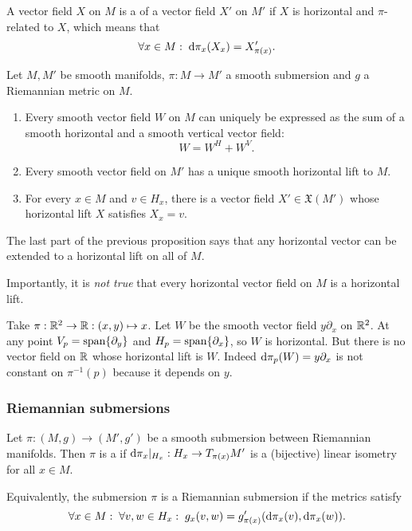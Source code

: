 A vector field $X$ on $M$ is a  of a vector field $X'$ on $M'$ if $X$ is horizontal and $\pi$-related to $X$, which means that
\[ \forall x\in M: \; \operatorname{d \!}{\pi}_x(X_x) = X'_{\pi(x)} .\]

\begin{proposition}
Let $M,M'$ be smooth manifolds, $\pi:M\to M'$ a smooth submersion and $g$ a Riemannian metric on $M$.
\begin{enumerate}
\item Every smooth vector field $W$ on $M$ can uniquely be expressed as the sum of a smooth horizontal and a smooth vertical vector field:
\[ W = W^H + W^V. \]
\item Every smooth vector field on $M'$ has a unique smooth horizontal lift to $M$.
\item For every $x\in M$ and $v\in H_x$, there is a vector field $X'\in\mathfrak{X}(M')$ whose horizontal lift $X$ satisfies $X_x = v$.
\end{enumerate}
\end{proposition}
The last part of the previous proposition says that any horizontal vector can be extended to a horizontal lift on all of $M$.

Importantly, it is \emph{not true} that every horizontal vector field on $M$ is a horizontal lift.
\begin{example}
Take $\pi: \mathbb{R}^2\to\mathbb{R}: (x,y)\mapsto x$. Let $W$ be the smooth vector field $y\partial_x$ on $\mathbb{R}^2$. At any point $V_p= \operatorname{span}\{\partial_y\}$ and $H_p= \operatorname{span}\{\partial_x\}$, so $W$ is horizontal. But there is no vector field on $\mathbb{R}$ whose horizontal lift is $W$. Indeed $\operatorname{d \!}{\pi}_p(W) = y\partial_x$ is not constant on $\pi^{-1}(p)$ because it depends on $y$.
\end{example}

\subsubsection{Riemannian submersions}
\begin{definition}
Let $\pi: (M,g)\to (M',g')$ be a smooth submersion between Riemannian manifolds. Then $\pi$ is a  if $\operatorname{d \!}{\pi}_x|_{H_x}: H_x\to T_{\pi(x)}M'$ is a (bijective) linear isometry for all $x\in M$.
\end{definition}
Equivalently, the submersion $\pi$ is a Riemannian submersion if the metrics satisfy
\[ \forall x\in M:\; \forall v,w\in H_x:\; g_x(v,w) = g'_{\pi(x)}(\operatorname{d \!}{\pi}_x(v), \operatorname{d \!}{\pi}_x(w)). \]

